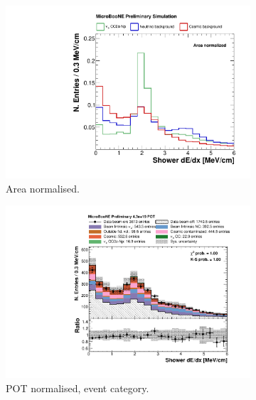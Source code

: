 \begin{figure}[htbp]
\centering
  \begin{subfigure}{0.49\textwidth}
    \includegraphics[width=\linewidth]{figures/h_shower_dedx_cali_norm.pdf}
    \caption{Area normalised.} \label{fig:dedx_norm}
  \end{subfigure}
    \begin{subfigure}{0.49\textwidth}
    \includegraphics[width=\linewidth]{figures/h_shower_dedx_cali.pdf}
    \caption{POT normalised, event category.} \label{fig:dedx_pot}
  \end{subfigure}
  \begin{subfigure}{0.49\textwidth}

\end{subfigure}
\end{figure}
